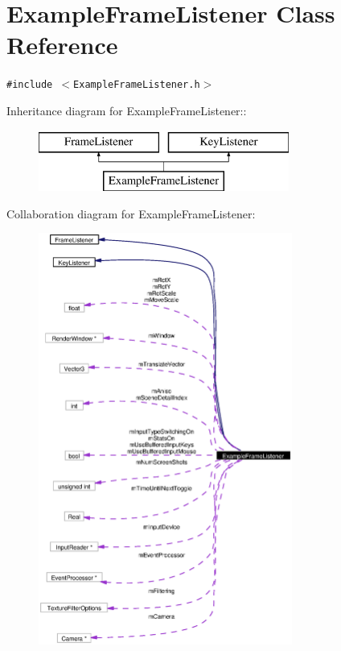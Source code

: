 \section{Example\-Frame\-Listener Class Reference}
\label{classExampleFrameListener}
{\tt \#include $<$Example\-Frame\-Listener.h$>$}

Inheritance diagram for Example\-Frame\-Listener::\begin{figure}[H]
\begin{center}
\leavevmode
\includegraphics[height=2cm]{classExampleFrameListener}
\end{center}
\end{figure}
Collaboration diagram for Example\-Frame\-Listener:\begin{figure}[H]
\begin{center}
\leavevmode
\includegraphics[width=236pt]{classExampleFrameListener__coll__graph}
\end{center}
\end{figure}
